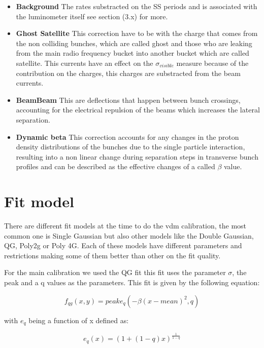 \begin{itemize}
  \item \textbf{Background} The rates substracted on the SS periods and is associated with the luminometer itself see section (3.x) for more.
  \item \textbf {Ghost Satellite} This correction have to be with the charge that comes from the non colliding bunches, which are called ghost and those who are leaking from the main radio frequency bucket into another bucket which are called satellite. This currents have an effect on the $\sigma_{visible}$ measure because of the contribution on the charges, this charges are substracted from the beam currents.  \cite{ghost}
  \item \textbf{BeamBeam} This are deflections that happen between bunch crossings, accounting for the electrical repulsion of the beams which increases the lateral separation.   \cite{beambeam}
  \item \textbf{Dynamic beta} This correction accounts for any changes in the proton density distributions of the bunches due to the single particle interaction, resulting into a non linear change during separation steps in transverse bunch profiles and can be described as the effective changes of a called $\beta$ value. \cite{LHClum}
\end{itemize}


\section{Fit model} 

There are different fit models at the time to do the vdm calibration, the most common one is Single Gaussian but also other models like the Double Gaussian, QG, Poly2g or Poly 4G. Each of these models have different parameters and restrictions making some of them better than other on the fit quality. 

For the main calibration we used the QG fit this fit uses the parameter $\sigma$, the peak and a q values as the parameters. This fit is given by the following equation:


\begin{equation}
f_{qg}(x,y) = peak e_{q}(-\beta(x - mean)^{2},q)
\end{equation}

with $e_{q}$ being a function of x defined as: 

\begin{equation}
e_{q}(x) = (1+(1-q)x)^{\frac{1}{1-q}}
\end{equation}


